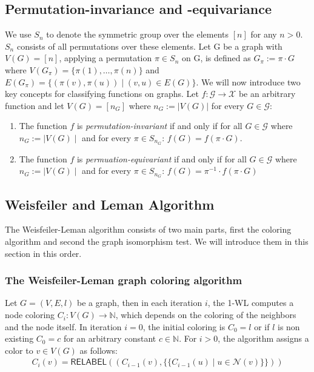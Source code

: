 \documentclass[11pt, dvipsnames, DIV=12]{scrreprt}
\theoremstyle{definition}
\newcommand{\MSopen}{\{\!\!\{}
\newcommand{\MSclose}{\}\!\!\}}
\begin{document}
\subsection{Permutation-invariance and -equivariance}
We use $S_n$ to denote the symmetric group over the elements $[n]$ for any $n > 0$. $S_n$ consists of all permutations over these elements. Let G be a graph with $V(G) = [n]$, applying a permutation $\pi \in S_n$ on G, is defined as $G_\pi := \pi \cdot G$ where $V(G_\pi) = \{\pi(1), \ldots, \pi(n) \}$ and $E(G_\pi) = \{ (\pi(v), \pi(u)) \mid (v,u) \in E(G)\}$. We will now introduce two key concepts for classifying functions on graphs. Let $f: \mathcal{G} \rightarrow \mathcal{X}$ be an arbitrary function and let $V(G) = [n_G]$ where $n_G := |V(G)|$ for every $G \in \mathcal{G}$:\\
\begin{enumerate}
    \item The function $f$ is \textit{permutation-invariant} if and only if for all $G \in \mathcal{G}$ where $n_G := \mid V(G) \mid$ and for every $\pi \in S_{n_G}$: $f(G) = f(\pi \cdot G)$.
    \item The function $f$ is \textit{permuation-equivariant} if and only if for all $G \in \mathcal{G}$ where $n_G := \mid V(G) \mid$ and for every $\pi \in S_{n_G}$: $f(G) = \pi^{-1} \cdot f(\pi \cdot G)$
\end{enumerate}


\subsection{Weisfeiler and Leman Algorithm}\label{sec:1-WL Definition}
The Weisfeiler-Leman algorithm consists of two main parts, first the coloring algorithm and second the graph isomorphism test. We will introduce them in this section in this order. 

\subsubsection{The Weisfeiler-Leman graph coloring algorithm}
Let $G = (V,E,l)$ be a graph, then in each iteration $i$, the 1-WL computes a node coloring $C_i: V(G) \rightarrow \mathbb{N}$, which depends on the coloring of the neighbors and the node itself. In iteration $i=0$, the initial coloring is $C_0 = l$ or if $l$ is non existing $C_0 = c$ for an arbitrary constant $c \in \mathbb{N}$. For $i > 0$, the algorithm assigns a color to $v \in V(G)$ as follows:
\begin{align*}
C_i (v) = \textsf{RELABEL}((C_{i-1}(v), \MSopen C_{i-1}(u) \mid u \in \mathcal{N}(v) \MSclose))
\end{align*}
\end{document}
